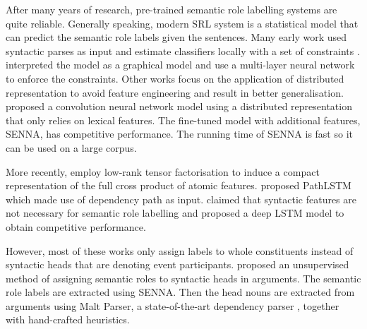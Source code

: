 \documentclass[a4paper]{article}
\begin{document}
After many years of research, pre-trained semantic role labelling systems are quite reliable. Generally speaking, modern SRL system is a statistical model that can predict the semantic role labels given the sentences. Many early work used syntactic parses as input and estimate classifiers locally with a set of constraints \citep{punyakanok2008importance}. \citet{tackstrom2015efficient} interpreted the model as a graphical model and use a multi-layer neural network to enforce the constraints. Other works focus on the application of distributed representation to avoid feature engineering and result in better generalisation. \citet{collobert2007fast, collobert2011natural} proposed a convolution neural network model using a distributed representation that only relies on lexical features. The fine-tuned model with additional features, SENNA, has competitive performance. The running time of SENNA is fast so it can be used on a large corpus. 
% 
% 
% 
%


More recently, \citet{lei-EtAl:2015:NAACL-HLT} employ low-rank tensor factorisation to induce a compact representation of the full cross product of atomic features. \citet{roth2016neural} proposed PathLSTM which made use of dependency path as input. \citet{marcheggiani2017simple} claimed that syntactic features are not necessary for semantic role labelling and proposed a deep LSTM model to obtain competitive performance. 

However, most of these works only assign labels to whole constituents instead of syntactic heads that are denoting event participants. \citet{SayeedEtAl2015} proposed an unsupervised method of assigning semantic roles to syntactic heads in arguments. The semantic role labels are extracted using SENNA. Then the head nouns are extracted from arguments using Malt Parser, a state-of-the-art dependency parser \citep{nivre2006maltparser}, together with hand-crafted heuristics. 
\end{document}
